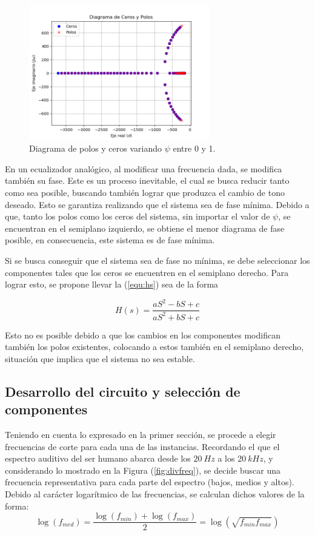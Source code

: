 \begin{figure}[H]
	\centering
	\includegraphics[width=0.7\textwidth]{Imagenes/Zplanepsi.png}
\caption{Diagrama de polos y ceros variando $\psi$ entre 0 y 1.}
	\label{fig:zplanepsi}
\end{figure}

En un ecualizador analógico, al modificar una frecuencia dada, se modifica también su fase. Este es un proceso inevitable, el cual se busca reducir tanto como sea posible, buscando también lograr que produzca el cambio de tono deseado. Esto se garantiza realizando que el sistema sea de fase mínima.
Debido a que, tanto los polos como los ceros del sistema, sin importar el valor de $\psi$, se encuentran en el semiplano izquierdo, se obtiene el menor diagrama de fase posible, en consecuencia, este sistema es de fase mínima.

Si se busca conseguir que el sistema sea de fase no mínima, se debe seleccionar los componentes tales que los ceros se encuentren en el semiplano derecho. Para lograr esto, se propone llevar la (\ref{equ:hs}) sea de la forma

\begin{equation*}
	H(s) = \frac{a S^2 - b S + c}{a S^2 + b S + c}
\end{equation*}

Esto no es posible debido a que los cambios en los componentes modifican también los polos existentes, colocando a estos también en el semiplano derecho, situación que implica que el sistema no sea estable. 

\subsection{Desarrollo del circuito y selección de componentes}
\label{sub:desarrollo}

Teniendo en cuenta lo expresado en la primer sección, se procede a elegir frecuencias de corte para cada una de las instancias. Recordando el que el espectro auditivo del ser humano abarca desde los $20 \ Hz$ a los $20 \ kHz$, y considerando lo mostrado en la Figura (\ref{fig:divfreq}), se decide buscar una frecuencia representativa para cada parte del espectro (bajos, medios y altos). Debido al carácter logarítmico de las frecuencias, se calculan dichos valores de la forma:
\begin{equation*}
	\log{(f_{med})} = \frac{\log(f_{min}) + \log(f_{max})}{2} = \log(\sqrt{f_{min} f_{max}})
\end{equation*}

